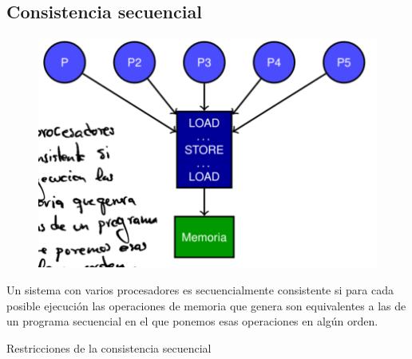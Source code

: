 \documentclass[12pt, twoside, openright]{report} %
\begin{document}
\subsection{Consistencia secuencial}
\begin{figure}[H]
  {\includegraphics[scale=.5]{Untitled 58.png}}
\end{figure}


    Un sistema con varios procesadores es secuencialmente consistente
    si para cada posible ejecución las operaciones de memoria que
    genera son equivalentes a las de un programa secuencial en el que
    ponemos esas operaciones en algún orden.

\pagebreak

    Restricciones de la consistencia secuencial
\end{document}

